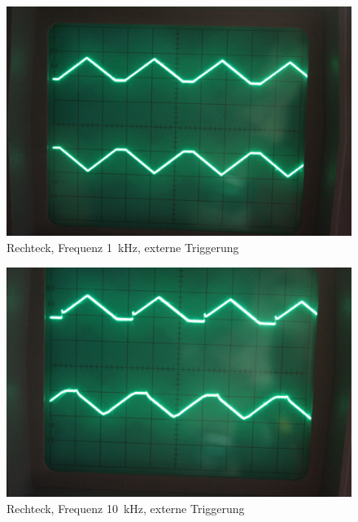 \begin{figure}
	\centering
	\begin{minipage}{.45\linewidth}
	\end{minipage}
	\hfill
	\begin{minipage}{.45\linewidth}
	\includegraphics[width=\linewidth]{Fotos/IMG_0776-1500.jpg}
	\end{minipage}
	\caption{%
		Rechteck, Frequenz \SI{1}{\kilo\hertz},
		externe Triggerung
	}
	\label{fig:0776}
\end{figure}

\begin{figure}
	\centering
	\begin{minipage}{.45\linewidth}
	\end{minipage}
	\hfill
	\begin{minipage}{.45\linewidth}
	\includegraphics[width=\linewidth]{Fotos/IMG_0777-1500.jpg}
	\end{minipage}
	\caption{%
		Rechteck, Frequenz \SI{10}{\kilo\hertz},
		externe Triggerung
	}
	\label{fig:0777}
\end{figure}

